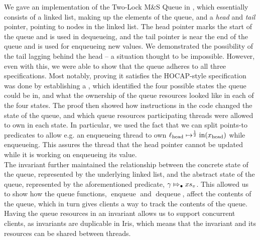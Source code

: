\documentclass[a4paper, 10pt]{report}
\theoremstyle{definition}
\newcommand{\enqueue}{\operatorname{enqueue}}
\newcommand{\dequeue}{\operatorname{dequeue}}
\newcommand{\msq}{M\&S Queue}
\newcommand{\tlmsq}{Two-Lock \msq{}}
\newcommand{\locN}[1]{\loc_{\mathrm{#1}}}
\newcommand{\lochead}{\locN{head}}
\newcommand{\nIn}[1]{\operatorname{in}(#1)}
\newcommand{\node}{x}
\newcommand{\nodeN}[1]{\node_{\mathrm{#1}}}
\newcommand{\nodehead}{\nodeN{head}}
\newcommand{\absvalueList}{xs_v}
\newcommand{\abstractstateauth}[2]{#1 \Mapsto_{\bullet} #2}
\begin{document}
We gave an implementation of the \tlmsq{} in \heaplang{}, which essentially consists of a linked list, making up the elements of the queue, and a \textit{head} and \textit{tail} pointer, pointing to nodes in the linked list. The head pointer marks the start of the queue and is used in dequeueing, and the tail pointer is near the end of the queue and is used for enqueueing new values. We demonstrated the possibility of the tail lagging behind the head -- a situation thought to be impossible. However, even with this, we were able to show that the queue adheres to all three specifications. Most notably, proving it satisfies the HOCAP-style specification was done by establishing a , which identified the four possible states the queue could be in, and what the ownership of the queue resources looked like in each of the four states. The proof then showed how instructions in the code changed the state of the queue, and which queue resources participating threads were allowed to own in each state. In particular, we used the fact that we can split points-to predicates to allow e.g. an enqueueing thread to own $\lochead \mapsto^{\frac{1}{2}} \nIn{\nodehead}$ while enqueueing. This assures the thread that the head pointer cannot be updated while it is working on enqueueing its value.\\
The invariant further maintained the relationship between the concrete state of the queue, represented by the underlying linked list, and the abstract state of the queue, represented by the aforementioned predicate, $\abstractstateauth{\gname}{\absvalueList}$. This allowed us to show how the queue functions, $\enqueue$ and $\dequeue$, affect the contents of the queue, which in turn gives clients a way to track the contents of the queue.\\
Having the queue resources in an invariant allows us to support concurrent clients, as invariants are duplicable in Iris, which means that the invariant and its resources can be shared between threads.
\end{document}
